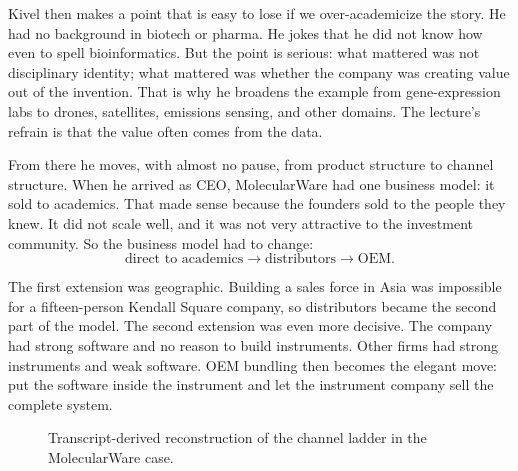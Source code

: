Kivel then makes a point that is easy to lose if we over-academicize the story. He had no background in biotech or pharma. He jokes that he did not know how even to spell bioinformatics. But the point is serious: what mattered was not disciplinary identity; what mattered was whether the company was creating value out of the invention. That is why he broadens the example from gene-expression labs to drones, satellites, emissions sensing, and other domains. The lecture's refrain is that the value often comes from the data.

From there he moves, with almost no pause, from product structure to channel structure. When he arrived as CEO, MolecularWare had one business model: it sold to academics. That made sense because the founders sold to the people they knew. It did not scale well, and it was not very attractive to the investment community. So the business model had to change:
\begin{equation}
\text{direct to academics} \to \text{distributors} \to \text{OEM}.
\end{equation}

The first extension was geographic. Building a sales force in Asia was impossible for a fifteen-person Kendall Square company, so distributors became the second part of the model. The second extension was even more decisive. The company had strong software and no reason to build instruments. Other firms had strong instruments and weak software. OEM bundling then becomes the elegant move: put the software inside the instrument and let the instrument company sell the complete system.

\begin{figure}[htbp]
\centering
{}
\caption{Transcript-derived reconstruction of the channel ladder in the MolecularWare case.}
\end{figure}

